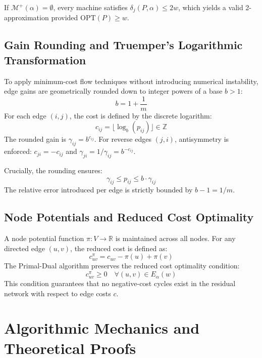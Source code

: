 \documentclass{article}
\begin{document}
If $\mathcal{M}^+(\alpha) = \emptyset$, every machine satisfies $\delta_j(P, \alpha) \le 2w$, which yields a valid 2-approximation provided $\text{OPT}(P) \ge w$.

\subsection{Gain Rounding and Truemper's Logarithmic Transformation}
To apply minimum-cost flow techniques without introducing numerical instability, edge gains are geometrically rounded down to integer powers of a base $b > 1$:
\begin{equation}
b = 1 + \frac{1}{m}
\end{equation}
For each edge $(i, j)$, the cost is defined by the discrete logarithm:
\begin{equation}
c_{ij} = \lfloor \log_b(p_{ij}) \rfloor \in \mathbb{Z}
\end{equation}
The rounded gain is $\gamma_{ij} = b^{c_{ij}}$. For reverse edges $(j, i)$, antisymmetry is enforced: $c_{ji} = -c_{ij}$ and $\gamma_{ji} = 1/\gamma_{ij} = b^{-c_{ij}}$.

Crucially, the rounding ensures:
\begin{equation}
\label{eq:rounding_bound}
\gamma_{ij} \le p_{ij} \le b \cdot \gamma_{ij}
\end{equation}
The relative error introduced per edge is strictly bounded by $b - 1 = 1/m$.

\subsection{Node Potentials and Reduced Cost Optimality}
A node potential function $\pi: V \to \mathbb{R}$ is maintained across all nodes. For any directed edge $(u, v)$, the reduced cost is defined as:
\begin{equation}
c_{uv}^\pi = c_{uv} - \pi(u) + \pi(v)
\end{equation}
The Primal-Dual algorithm preserves the reduced cost optimality condition:
\begin{equation}
c_{uv}^\pi \ge 0 \quad \forall (u, v) \in E_\alpha(w)
\end{equation}
This condition guarantees that no negative-cost cycles exist in the residual network with respect to edge costs $c$.

\section{Algorithmic Mechanics and Theoretical Proofs}
\label{sec:algorithms_proofs}
\end{document}
